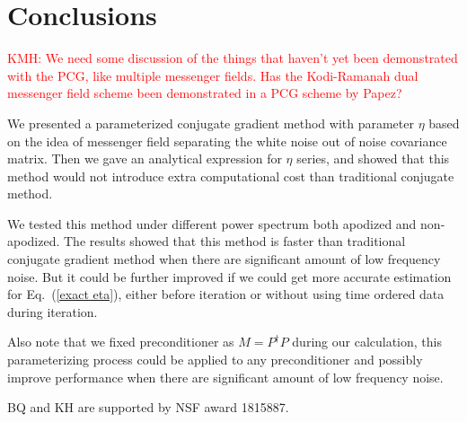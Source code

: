 \documentclass[twocolumn,linenumbers]{aastex631}
\newcommand{\Pdagger}{P^{\dagger}}
\newcommand{\kmh}[1]{\textcolor{red}{KMH: #1}}
\begin{document}

\section{Conclusions} \label{sec:conclusions} 

\kmh{We need some discussion of the things that haven't yet been demonstrated with the PCG, like multiple messenger fields.  Has the Kodi-Ramanah dual messenger field scheme been demonstrated in a PCG scheme by Papez?}

We presented a parameterized conjugate gradient method with parameter $\eta$ based on the idea of messenger field
separating the white noise out of noise covariance matrix.
Then we gave an analytical expression for $\eta$ series,
and showed that this method would not introduce extra computational cost than traditional conjugate method.

We tested this method under different power spectrum both apodized and non-apodized.
The results showed that this method is faster than traditional conjugate gradient method 
when there are significant amount of low frequency noise.
But it could be further improved if we could get more accurate estimation for Eq.~(\ref{exact eta}),
either before iteration or without using time ordered data during iteration.

Also note that we fixed preconditioner as $M = \Pdagger P$ during our calculation,
this parameterizing process could be applied to any preconditioner and possibly improve performance when 
there are significant amount of low frequency noise.
















\begin{acknowledgments}
BQ and KH are supported by NSF award 1815887.
\end{acknowledgments}
\end{document}

